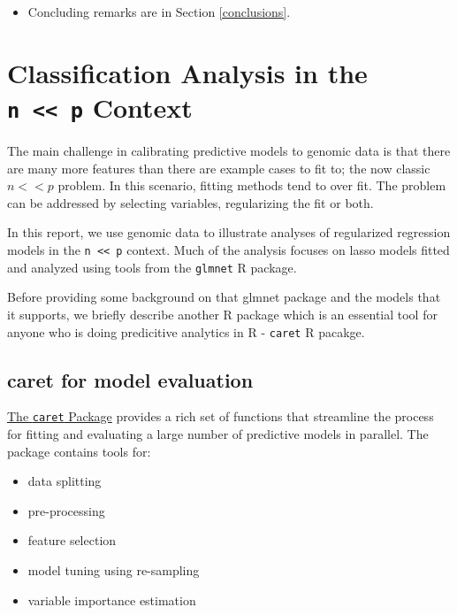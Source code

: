 \documentclass[
]{book}
\providecommand{\tightlist}{%
  \setlength{\itemsep}{0pt}\setlength{\parskip}{0pt}}
\begin{document}
\begin{itemize}
\tightlist
\item
  Concluding remarks are in Section \ref{conclusions}.
\end{itemize}

\hypertarget{modeling-background}{%
\chapter{\texorpdfstring{Classification Analysis in the \texttt{n\ \textless{}\textless{}\ p} Context}{Classification Analysis in the n \textless\textless{} p Context}}\label{modeling-background}}

The main challenge in calibrating predictive models to genomic data is that
there are many more features than there are example cases to fit to;
the now classic \(n << p\) problem.
In this scenario, fitting methods tend to over fit. The problem
can be addressed by selecting variables, regularizing the fit or both.

In this report, we use genomic data to illustrate analyses of regularized regression
models in the \texttt{n\ \textless{}\textless{}\ p} context. Much of the analysis focuses on lasso models fitted
and analyzed using tools from the \texttt{glmnet} R package.

Before providing some background on that glmnet package and the
models that it supports, we briefly describe another R package
which is an essential tool for anyone who is doing predicitive analytics in R - \texttt{caret} R pacakge.

\hypertarget{caret-for-model-evaluation}{%
\section{caret for model evaluation}\label{caret-for-model-evaluation}}

\href{https://topepo.github.io/caret/index.html}{The \texttt{caret} Package}
provides a rich set of functions that streamline the process for fitting and
evaluating a large number of predictive models in parallel. The package contains tools for:

\begin{itemize}
\tightlist
\item
  data splitting\\
\item
  pre-processing\\
\item
  feature selection\\
\item
  model tuning using re-sampling\\
\item
  variable importance estimation
\end{itemize}
\end{document}

